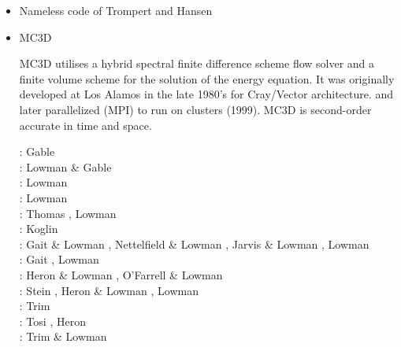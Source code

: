 \begin{itemize}
\item Nameless code of Trompert and Hansen

\begin{scriptsize}
\cite{trha96}
\cite{trha98}\cite{trha98b}
\cite{goch04}
\cite{losh06}
\cite{loha08}\cite{stha08}
\cite{stfh10}
\cite{stlh13}
\cite{stha13}
\cite{stha14}
\end{scriptsize} 

\item MC3D 

MC3D utilises a hybrid spectral finite difference scheme flow
solver and a finite volume scheme for the solution of the energy equation.
It was originally developed at Los Alamos in the late 1980’s for Cray/Vector architecture. 
and later parallelized (MPI) to run on clusters (1999).
MC3D is second-order accurate in time and space.

\begin{scriptsize}
\nineteenninetyone:  Gable \etal \cite{gaot91}\\
\nineteenninetynine:  Lowman \& Gable \cite{loga99}\\
\twothousandone:  Lowman \etal \cite{lokg01}\\
\twothousandthree:  Lowman \etal \cite{lokg03}\\
\twothousandfour:  Thomas \etal \cite{thkl04} , Lowman \etal \cite{lokg04} \\
\twothousandfive:  Koglin \etal \cite{kogk05} \\
\twothousandseven: Gait \& Lowman \cite{galo07,galo07b}, Nettelfield \& Lowman \cite{nelo07},
                   Jarvis \& Lowman \cite{jalo07}, Lowman \etal \cite{lopk07}\\
\twothousandeight: Gait \etal \cite{galg08}, Lowman \etal \cite{logg08}\\
\twothousandten: Heron \& Lowman \cite{helo10}, O'Farrell \& Lowman \cite{oflo10}\\
\twothousandeleven: Stein \etal \cite{stfl11}, Heron \& Lowman \cite{helo11}, Lowman \etal \cite{lokt11}\\
\twothousandfourteen: Trim \etal \cite{trhs14}\\
\twothousandfifteen: Tosi \etal \cite{tosn15}, Heron \etal \cite{hels15}\\
\twothousandsixteen: Trim \& Lowman \cite{trlo16}
\end{scriptsize} 


\end{itemize}
